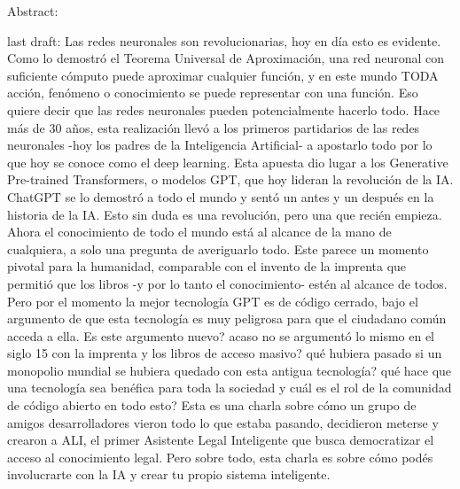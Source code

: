 Abstract: 

last draft: 
Las redes neuronales son revolucionarias, hoy en día esto es evidente.
Como lo demostró el Teorema Universal de Aproximación, una red neuronal con suficiente cómputo puede aproximar cualquier función, y en este mundo TODA acción, fenómeno o conocimiento se puede representar con una función. Eso quiere decir que las redes neuronales pueden potencialmente hacerlo todo.
Hace más de 30 años, esta realización llevó a los primeros partidarios de las redes neuronales -hoy los padres de la Inteligencia Artificial- a apostarlo todo por lo que hoy se conoce como el deep learning. Esta apuesta dio lugar a los Generative Pre-trained Transformers, o modelos GPT, que hoy lideran la revolución de la IA. ChatGPT se lo demostró a todo el mundo y sentó un antes y un después en la historia de la IA. Esto sin duda es una revolución, pero una que recién empieza. Ahora el conocimiento de todo el mundo está al alcance de la mano de cualquiera, a solo una pregunta de averiguarlo todo. Este parece un momento pivotal para la humanidad, comparable con el invento de la imprenta que permitió que los libros -y por lo tanto el conocimiento- estén al alcance de todos.
Pero por el momento la mejor tecnología GPT es de código cerrado, bajo el argumento de que esta tecnología es muy peligrosa para que el ciudadano común acceda a ella. Es este argumento nuevo? acaso no se argumentó lo mismo en el siglo 15 con la imprenta y los libros de acceso masivo? qué hubiera pasado si un monopolio mundial se hubiera quedado con esta antigua tecnología? qué hace que una tecnología sea benéfica para toda la sociedad y cuál es el rol de la comunidad de código abierto en todo esto?
Esta es una charla sobre cómo un grupo de amigos desarrolladores vieron todo lo que estaba pasando, decidieron meterse y crearon a ALI, el primer Asistente Legal Inteligente que busca democratizar el acceso al conocimiento legal.
Pero sobre todo, esta charla es sobre cómo podés involucrarte con la IA y crear tu propio sistema inteligente.


